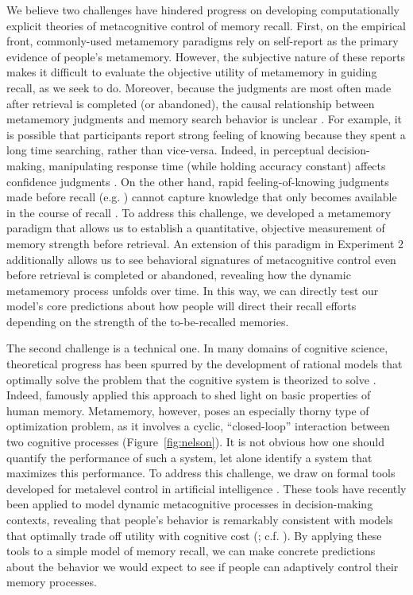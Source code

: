We believe two challenges have hindered progress on developing computationally explicit theories of metacognitive control of memory recall. First, on the empirical front, commonly-used metamemory paradigms rely on self-report as the primary evidence of people's metamemory. However, the subjective nature of these reports makes it difficult to evaluate the objective utility of metamemory in guiding recall, as we seek to do. Moreover, because the judgments are most often made after retrieval is completed (or abandoned), the causal relationship between metamemory judgments and memory search behavior is unclear \citep{schwartz2001relation}. For example, it is possible that participants report strong feeling of knowing because they spent a long time searching, rather than vice-versa. Indeed, in perceptual decision-making, manipulating response time (while holding accuracy constant) affects confidence judgments \citep{kiani2014choice}. On the other hand, rapid feeling-of-knowing judgments made before recall (e.g. \citealp{reder1987strategy}) cannot capture knowledge that only becomes available in the course of recall \citep{koriat1993how,nhouyvanisvong1998rapid}. To address this challenge, we developed a metamemory paradigm that allows us to establish a quantitative, objective measurement of memory strength before retrieval. An extension of this paradigm in Experiment 2 additionally allows us to see behavioral signatures of metacognitive control even before retrieval is completed or abandoned, revealing how the dynamic metamemory process unfolds over time. In this way, we can directly test our model's core predictions about how people will direct their recall efforts depending on the strength of the to-be-recalled memories.

The second challenge is a technical one. In many domains of cognitive science, theoretical progress has been spurred by the development of rational models that optimally solve the problem that the cognitive system is theorized to solve \citep{savage1954foundations,tenenbaum2001generalization,anderson1991adaptive,knill1996perception,marr1982vision}. Indeed, \citet{anderson1989human} famously applied this approach to shed light on basic properties of human memory. Metamemory, however, poses an especially thorny type of optimization problem, as it involves a cyclic, ``closed-loop'' interaction between two cognitive processes (Figure~\ref{fig:nelson}). It is not obvious how one should quantify the performance of such a system, let alone identify a system that maximizes this performance. To address this challenge, we draw on formal tools developed for metalevel control in artificial intelligence \citep{russell1991principles,hay2016principles}. These tools have recently been applied to model dynamic metacognitive processes in decision-making contexts, revealing that people's behavior is remarkably consistent with models that optimally trade off utility with cognitive cost (\citealp{callaway2021fixation,callaway2022rational}; c.f. \citealp{drugowitsch2012cost,tajima2019optimal,jang2021optimal,chen2021apparently}). By applying these tools to a simple model of memory recall, we can make concrete predictions about the behavior we would expect to see if people can adaptively control their memory processes.

